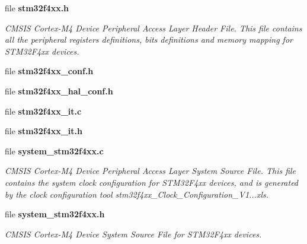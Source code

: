 \begin{DoxyCompactItemize}
file \textbf{ stm32f4xx.\+h}
\begin{DoxyCompactList}\small\item\em C\+M\+S\+IS Cortex-\/\+M4 Device Peripheral Access Layer Header File. This file contains all the peripheral register\textquotesingle{}s definitions, bits definitions and memory mapping for S\+T\+M32\+F4xx devices. \end{DoxyCompactList}\item 
file \textbf{ stm32f4xx\+\_\+conf.\+h}
\item 
file \textbf{ stm32f4xx\+\_\+hal\+\_\+conf.\+h}
\item 
file \textbf{ stm32f4xx\+\_\+it.\+c}
\item 
file \textbf{ stm32f4xx\+\_\+it.\+h}
\item 
file \textbf{ system\+\_\+stm32f4xx.\+c}
\begin{DoxyCompactList}\small\item\em C\+M\+S\+IS Cortex-\/\+M4 Device Peripheral Access Layer System Source File. This file contains the system clock configuration for S\+T\+M32\+F4xx devices, and is generated by the clock configuration tool stm32f4xx\+\_\+\+Clock\+\_\+\+Configuration\+\_\+\+V1...\+xls. \end{DoxyCompactList}\item 
file \textbf{ system\+\_\+stm32f4xx.\+h}
\begin{DoxyCompactList}\small\item\em C\+M\+S\+IS Cortex-\/\+M4 Device System Source File for S\+T\+M32\+F4xx devices. \end{DoxyCompactList}\end{DoxyCompactItemize}
